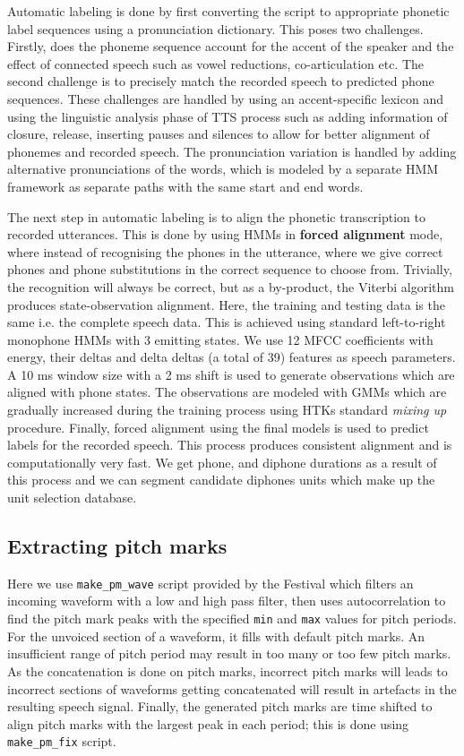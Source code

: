 \documentclass[lettersize,journal]{IEEEtran}
\begin{document}
Automatic labeling is done by first converting the script to appropriate phonetic label sequences using a pronunciation dictionary. This poses two challenges. Firstly, does the phoneme sequence account for the accent of the speaker and the effect of connected speech such as vowel reductions, co-articulation etc. The second challenge is to precisely match the recorded speech to predicted phone sequences. These challenges are handled by using an accent-specific lexicon and using the linguistic analysis phase of TTS process such as adding information of closure, release, inserting pauses and silences to allow for better alignment of phonemes and recorded speech. The pronunciation variation is handled by adding alternative pronunciations of the words, which is modeled by a separate HMM framework as separate paths with the same start and end words.

The next step in automatic labeling is to align the phonetic transcription to recorded utterances. This is done by using HMMs in \textbf{forced alignment} mode, where instead of recognising the phones in the utterance, where we give correct phones and phone substitutions in the correct sequence to choose from. Trivially, the recognition will always be correct, but as a by-product, the Viterbi algorithm produces state-observation alignment. Here, the training and testing data is the same i.e. the complete speech data. This is achieved using standard left-to-right monophone HMMs with 3 emitting states. We use 12 MFCC coefficients with energy, their deltas and delta deltas (a total of 39) features as speech parameters. A 10 ms window size with a 2 ms shift is used to generate observations which are aligned with phone states. The observations are modeled with GMMs which are gradually increased during the training process using HTKs standard \textit{mixing up} procedure. Finally, forced alignment using the final models is used to predict labels for the recorded speech. This process produces consistent alignment and is computationally very fast. We get phone, and diphone durations as a result of this process and we can segment candidate diphones units which make up the unit selection database.

\subsection{Extracting pitch marks}
\label{section:extracting_pm}
Here we use \verb|make_pm_wave| script provided by the Festival which filters an incoming waveform with a low and high pass filter, then uses autocorrelation to find the pitch mark peaks with the specified \verb|min| and \verb|max| values for pitch periods. For the unvoiced section of a waveform, it fills with default pitch marks.  An insufficient range of pitch period may result in too many or too few pitch marks. As the concatenation is done on pitch marks, incorrect pitch marks will leads to incorrect sections of waveforms getting concatenated will result in artefacts in the resulting speech signal. Finally, the generated pitch marks are time shifted to align pitch marks with the largest peak in each period; this is done using \verb|make_pm_fix| script.
\end{document}
